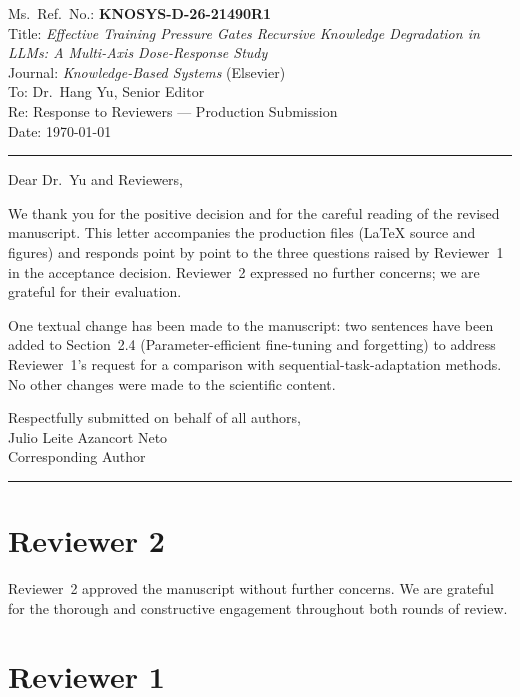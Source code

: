 \documentclass[11pt,a4paper]{article}
\begin{document}
\noindent
Ms.\ Ref.\ No.: \textbf{KNOSYS-D-26-21490R1}\\[2pt]
Title: \textit{Effective Training Pressure Gates Recursive Knowledge
Degradation in LLMs: A Multi-Axis Dose-Response Study}\\[2pt]
Journal: \textit{Knowledge-Based Systems} (Elsevier)\\[2pt]
To: Dr.\ Hang Yu, Senior Editor\\[2pt]
Re: Response to Reviewers --- Production Submission\\[2pt]
Date: \today

\bigskip
\medskip\noindent\rule{\linewidth}{0.4pt}\medskip

\noindent
Dear Dr.\ Yu and Reviewers,

We thank you for the positive decision and for the careful reading of the
revised manuscript.
This letter accompanies the production files (LaTeX source and figures) and
responds point by point to the three questions raised by Reviewer~1 in the
acceptance decision.
Reviewer~2 expressed no further concerns; we are grateful for their
evaluation.

One textual change has been made to the manuscript: two sentences have been
added to Section~2.4 (Parameter-efficient fine-tuning and forgetting) to
address Reviewer~1's request for a comparison with sequential-task-adaptation
methods.
No other changes were made to the scientific content.

\medskip\noindent
Respectfully submitted on behalf of all authors,\\[6pt]
Julio Leite Azancort Neto\\
Corresponding Author

\medskip\noindent\rule{\linewidth}{0.4pt}\medskip

\section*{Reviewer 2}

Reviewer~2 approved the manuscript without further concerns.
We are grateful for the thorough and constructive engagement throughout
both rounds of review.

\section*{Reviewer 1}
\end{document}
